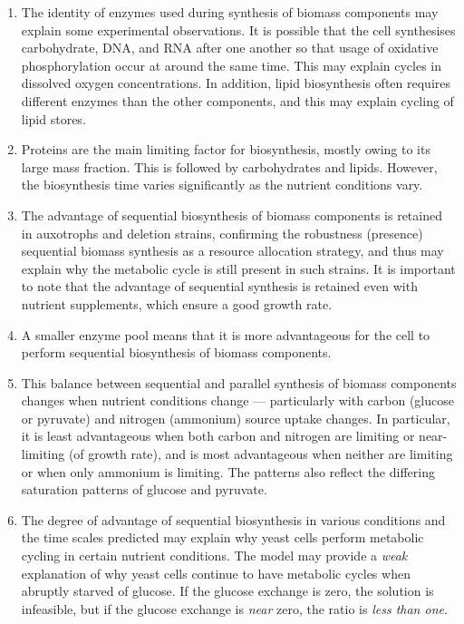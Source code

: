 \begin{enumerate}
  \item The identity of enzymes used during synthesis of biomass components may explain some experimental observations.
        It is possible that the cell synthesises carbohydrate, DNA, and RNA after one another so that usage of  oxidative phosphorylation occur at around the same time.
        This may explain cycles in dissolved oxygen concentrations.
        In addition, lipid biosynthesis often requires different enzymes than the other components, and this may explain cycling of lipid stores.
  \item Proteins are the main limiting factor for biosynthesis, mostly owing to its large mass fraction.
        This is followed by carbohydrates and lipids.
        However, the biosynthesis time varies significantly as the nutrient conditions vary.
  \item The advantage of sequential biosynthesis of biomass components is retained in auxotrophs and deletion strains, confirming the robustness (presence) sequential biomass synthesis as a resource allocation strategy, and thus may explain why the metabolic cycle is still present in such strains.
        It is important to note that the advantage of sequential synthesis is retained even with nutrient supplements, which ensure a good growth rate.
  \item A smaller enzyme pool means that it is more advantageous for the cell to perform sequential biosynthesis of biomass components.
  \item This balance between sequential and parallel synthesis of biomass components changes when nutrient conditions change --- particularly with carbon (glucose or pyruvate) and nitrogen (ammonium) source uptake changes.
        In particular, it is least advantageous when both carbon and nitrogen are limiting or near-limiting (of growth rate), and is most advantageous when neither are limiting or when only ammonium is limiting.
        The patterns also reflect the differing saturation patterns of glucose and pyruvate.
  \item The degree of advantage of sequential biosynthesis in various conditions and the time scales predicted may explain why yeast cells perform metabolic cycling in certain nutrient conditions.
        The model may provide a \emph{weak} explanation of why yeast cells continue to have metabolic cycles when abruptly starved of glucose.
        If the glucose exchange is zero, the solution is infeasible, but if the glucose exchange is \emph{near} zero, the ratio is \emph{less than one}.

\end{enumerate}
